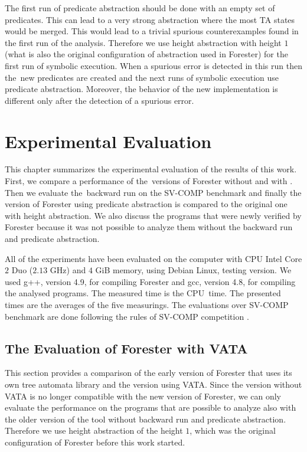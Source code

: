 The first run of predicate abstraction should be done
with an empty set of predicates.
This can lead to a very strong abstraction where the most TA states would be merged.
This would lead to a trivial spurious counterexamples found
in the first run of the analysis.
Therefore we use height abstraction with height $1$ (what is
also the original configuration of abstraction used in Forester)
for the first run of symbolic execution.
When a spurious error is detected in this run then the~new
predicates are created and the next runs of symbolic execution use predicate abstraction.
Moreover, the behavior of the new implementation is different only
after the detection of a spurious error.


\chapter{Experimental Evaluation}
\label{ch:eval}

This chapter summarizes the experimental evaluation of the results of this work.
First, we compare a performance of the~versions of Forester without and with \vata.
Then we evaluate the~backward run on the SV-COMP benchmark
and finally the version of Forester using predicate abstraction is compared to the
original one with height abstraction.
We also discuss the programs that were newly verified by Forester
because it was not possible to analyze them without the backward run and
predicate abstraction.

All of the experiments have been evaluated on the computer with CPU Intel Core $2$ Duo ($2.13$ GHz)
and $4$ GiB memory, using Debian Linux, testing version.
We used g++, version 4.9, for compiling Forester and gcc, version 4.8,
for compiling the analysed programs.
The measured time is the CPU~time.
The presented times are the averages of the five measurings.
The evaluations over SV-COMP benchmark are done following the rules of
SV-COMP competition \cite{www:svcomp}.

\section{The Evaluation of Forester with VATA}

This section provides a comparison of the early version of Forester
that uses its own tree automata library and the version using VATA.
Since the version without VATA is no longer compatible with the
new version of Forester, we can only evaluate the performance
on the programs that are possible to analyze also with the older
version of the tool without backward run and predicate abstraction.
Therefore we use height abstraction of the height $1$,
which was the original configuration of Forester before this
work started.

